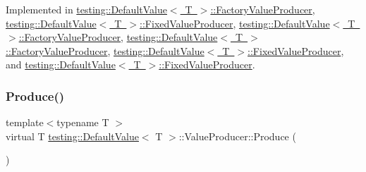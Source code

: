 Implemented in \mbox{\hyperlink{classtesting_1_1_default_value_1_1_factory_value_producer_a246a02412c099b293d905a9749c0fab3}{testing\+::\+Default\+Value$<$ T $>$\+::\+Factory\+Value\+Producer}}, \mbox{\hyperlink{classtesting_1_1_default_value_1_1_fixed_value_producer_ad7f695192e9dbc5f54cdb405655e7125}{testing\+::\+Default\+Value$<$ T $>$\+::\+Fixed\+Value\+Producer}}, \mbox{\hyperlink{classtesting_1_1_default_value_1_1_factory_value_producer_ad669217ac582007bc2e1b08dc13deba5}{testing\+::\+Default\+Value$<$ T $>$\+::\+Factory\+Value\+Producer}}, \mbox{\hyperlink{classtesting_1_1_default_value_1_1_factory_value_producer_ad669217ac582007bc2e1b08dc13deba5}{testing\+::\+Default\+Value$<$ T $>$\+::\+Factory\+Value\+Producer}}, \mbox{\hyperlink{classtesting_1_1_default_value_1_1_fixed_value_producer_a896da438af897dea6a473a11581aac10}{testing\+::\+Default\+Value$<$ T $>$\+::\+Fixed\+Value\+Producer}}, and \mbox{\hyperlink{classtesting_1_1_default_value_1_1_fixed_value_producer_a896da438af897dea6a473a11581aac10}{testing\+::\+Default\+Value$<$ T $>$\+::\+Fixed\+Value\+Producer}}.

\mbox{\label{classtesting_1_1_default_value_1_1_value_producer_adb9e38abe068ac2e792b53fd32bd7e96}} 
\subsubsection{\texorpdfstring{Produce()}{Produce()}\hspace{0.1cm}{\footnotesize\ttfamily [3/3]}}
{\footnotesize\ttfamily template$<$typename T $>$ \\
virtual T \mbox{\hyperlink{classtesting_1_1_default_value}{testing\+::\+Default\+Value}}$<$ T $>$\+::Value\+Producer\+::\+Produce (\begin{DoxyParamCaption}{ }\end{DoxyParamCaption})\hspace{0.3cm}{\ttfamily [pure virtual]}}



